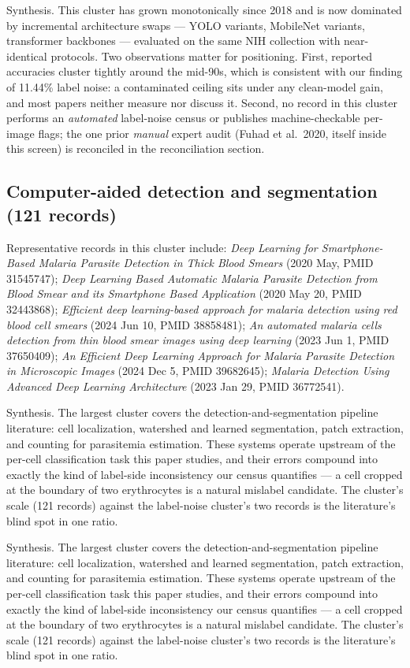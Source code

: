 Synthesis. This cluster has grown monotonically since 2018 and is now dominated by incremental architecture swaps --- YOLO variants, MobileNet variants, transformer backbones --- evaluated on the same NIH collection with near-identical protocols. Two observations matter for positioning. First, reported accuracies cluster tightly around the mid-90s, which is consistent with our finding of 11.44\% label noise: a contaminated ceiling sits under any clean-model gain, and most papers neither measure nor discuss it. Second, no record in this cluster performs an \emph{automated} label-noise census or publishes machine-checkable per-image flags; the one prior \emph{manual} expert audit (Fuhad et al.\ 2020, itself inside this screen) is reconciled in the reconciliation section.


\subsection*{Computer-aided detection and segmentation (121 records)}
Representative records in this cluster include: \emph{Deep Learning for Smartphone-Based Malaria Parasite Detection in Thick Blood Smears} (2020 May, PMID 31545747); \emph{Deep Learning Based Automatic Malaria Parasite Detection from Blood Smear and its Smartphone Based Application} (2020 May 20, PMID 32443868); \emph{Efficient deep learning-based approach for malaria detection using red blood cell smears} (2024 Jun 10, PMID 38858481); \emph{An automated malaria cells detection from thin blood smear images using deep learning} (2023 Jun 1, PMID 37650409); \emph{An Efficient Deep Learning Approach for Malaria Parasite Detection in Microscopic Images} (2024 Dec 5, PMID 39682645); \emph{Malaria Detection Using Advanced Deep Learning Architecture} (2023 Jan 29, PMID 36772541).\par

Synthesis. The largest cluster covers the detection-and-segmentation pipeline literature: cell localization, watershed and learned segmentation, patch extraction, and counting for parasitemia estimation. These systems operate upstream of the per-cell classification task this paper studies, and their errors compound into exactly the kind of label-side inconsistency our census quantifies --- a cell cropped at the boundary of two erythrocytes is a natural mislabel candidate. The cluster's scale (121 records) against the label-noise cluster's two records is the literature's blind spot in one ratio.


Synthesis. The largest cluster covers the detection-and-segmentation pipeline literature: cell localization, watershed and learned segmentation, patch extraction, and counting for parasitemia estimation. These systems operate upstream of the per-cell classification task this paper studies, and their errors compound into exactly the kind of label-side inconsistency our census quantifies --- a cell cropped at the boundary of two erythrocytes is a natural mislabel candidate. The cluster's scale (121 records) against the label-noise cluster's two records is the literature's blind spot in one ratio.


